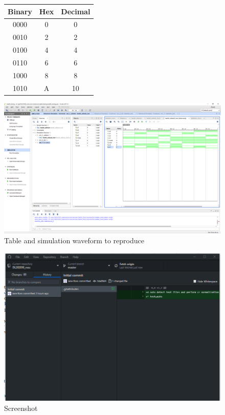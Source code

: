 \documentclass[11pt]{article}
\begin{document}
\begin{figure}[ht]\centering
	
	\begin{tabular}{c|c|c}
		\toprule
		Binary & Hex & Decimal \\
		\midrule
		0000 & 0 & 0 \\
		0010 & 2 & 2 \\
		0100 & 4 & 4 \\
		0110 & 6 & 6 \\
		1000 & 8 & 8 \\
		1010 & A & 10 \\
		\bottomrule
	\end{tabular}

	\centering
	\includegraphics[scale = 0.70,trim={18cm 15cm 0 4cm},clip]{lab1_example_screenshot}

	\caption{Table and simulation waveform to reproduce}
	\label{fig:lab1examplescreenshot}

\end{figure}

	

	
\begin{figure}
	\centering
	\includegraphics[width=0.7\linewidth]{"Screenshot of history"}
	\caption{Screenshot}
	\label{fig:screenshot-of-history}
\end{figure}
\end{document}
